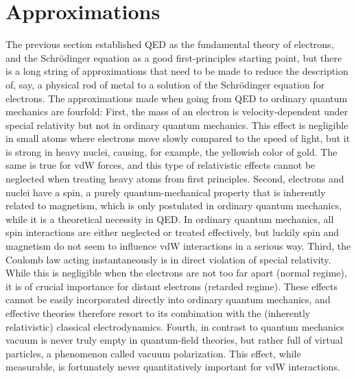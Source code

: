 \section{Approximations}

The previous section established QED as the fundamental theory of electrons, and the Schrödinger equation as a good first-principles starting point, but there is a long string of approximations that need to be made to reduce the description of, say, a physical rod of metal to a solution of the Schrödinger equation for electrons.
The approximations made when going from QED to ordinary quantum mechanics are fourfold:
First, the mass of an electron is velocity-dependent under special relativity but not in ordinary quantum mechanics.
This effect is negligible in small atoms where electrons move slowly compared to the speed of light, but it is strong in heavy nuclei, causing, for example, the yellowish color of gold.
The same is true for vdW forces, and this type of relativistic effects cannot be neglected when treating heavy atoms from first principles.
Second, electrons and nuclei have a spin, a purely quantum-mechanical property that is inherently related to magnetism, which is only postulated in ordinary quantum mechanics, while it is a theoretical necessity in QED\@.
In ordinary quantum mechanics, all spin interactions are either neglected or treated effectively, but luckily spin and magnetism do not seem to influence vdW interactions in a serious way.
Third, the Coulomb law acting instantaneously is in direct violation of special relativity.
While this is negligible when the electrons are not too far apart (normal regime), it is of crucial importance for distant electrons (retarded regime).
These effects cannot be easily incorporated directly into ordinary quantum mechanics, and effective theories therefore resort to its combination with the (inherently relativistic) classical electrodynamics.
Fourth, in contrast to quantum mechanics vacuum is never truly empty in quantum-field theories, but rather full of virtual particles, a phenomenon called vacuum polarization.
This effect, while measurable, is fortunately never quantitatively important for vdW interactions.

